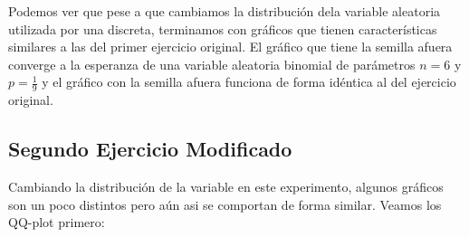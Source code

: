 \documentclass[a4paper]{article}
\begin{document}
	Podemos ver que pese a que cambiamos la distribuci\'on dela variable aleatoria utilizada por una discreta, terminamos con gr\'aficos que tienen caracter\'isticas similares a las del primer ejercicio original. El gr\'afico que tiene la semilla afuera converge a la esperanza de una variable aleatoria binomial de par\'ametros $n = 6$ y $p = \frac{1}{9}$ y el gr\'afico con la semilla afuera funciona de forma id\'entica al del ejercicio original.
	
	\subsection{Segundo Ejercicio Modificado}
	
	Cambiando la distribuci\'on de la variable en este experimento, algunos gr\'aficos son un poco distintos pero a\'un asi se comportan de forma similar. Veamos los QQ-plot primero:
	
\end{document}
